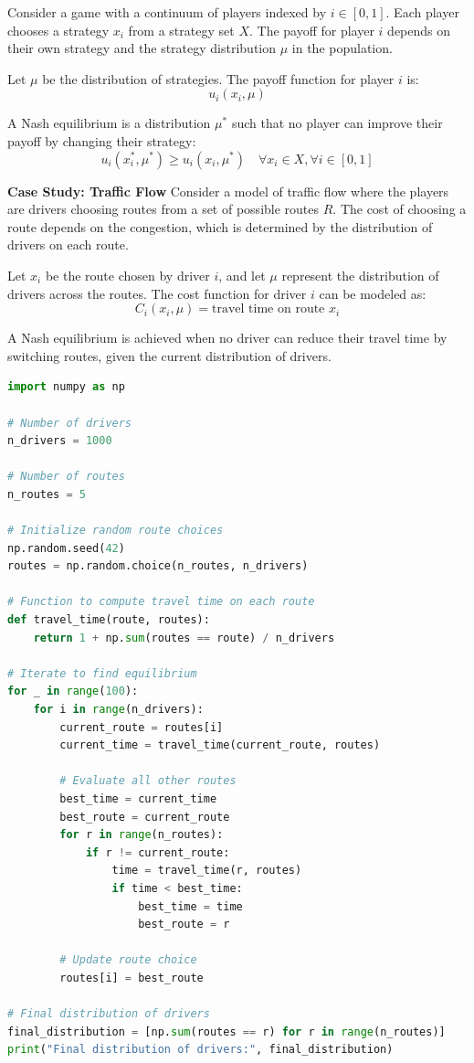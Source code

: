 \documentclass[12pt]{book} %
\begin{document}
Consider a game with a continuum of players indexed by $i \in [0,1]$. Each player chooses a strategy $x_i$ from a strategy set $X$. The payoff for player $i$ depends on their own strategy and the strategy distribution $\mu$ in the population.

Let $\mu$ be the distribution of strategies. The payoff function for player $i$ is:
\[
u_i(x_i, \mu)
\]

A Nash equilibrium is a distribution $\mu^*$ such that no player can improve their payoff by changing their strategy:
\[
u_i(x_i^*, \mu^*) \geq u_i(x_i, \mu^*) \quad \forall x_i \in X, \forall i \in [0,1]
\]

\textbf{Case Study: Traffic Flow}
Consider a model of traffic flow where the players are drivers choosing routes from a set of possible routes $R$. The cost of choosing a route depends on the congestion, which is determined by the distribution of drivers on each route.

Let $x_i$ be the route chosen by driver $i$, and let $\mu$ represent the distribution of drivers across the routes. The cost function for driver $i$ can be modeled as:
\[
C_i(x_i, \mu) = \text{travel time on route } x_i
\]

A Nash equilibrium is achieved when no driver can reduce their travel time by switching routes, given the current distribution of drivers.

\FloatBarrier
\begin{lstlisting}[language=Python, caption=Simulation of Traffic Flow]
import numpy as np

# Number of drivers
n_drivers = 1000

# Number of routes
n_routes = 5

# Initialize random route choices
np.random.seed(42)
routes = np.random.choice(n_routes, n_drivers)

# Function to compute travel time on each route
def travel_time(route, routes):
    return 1 + np.sum(routes == route) / n_drivers

# Iterate to find equilibrium
for _ in range(100):
    for i in range(n_drivers):
        current_route = routes[i]
        current_time = travel_time(current_route, routes)
        
        # Evaluate all other routes
        best_time = current_time
        best_route = current_route
        for r in range(n_routes):
            if r != current_route:
                time = travel_time(r, routes)
                if time < best_time:
                    best_time = time
                    best_route = r
        
        # Update route choice
        routes[i] = best_route

# Final distribution of drivers
final_distribution = [np.sum(routes == r) for r in range(n_routes)]
print("Final distribution of drivers:", final_distribution)
\end{lstlisting}
\FloatBarrier
\end{document}
